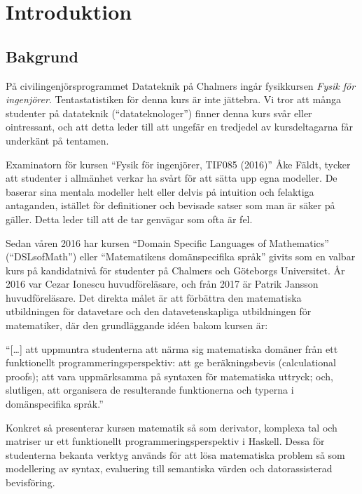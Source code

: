 
\chapter{Introduktion}

\section{Bakgrund}

På civilingenjörsprogrammet Datateknik på Chalmers ingår fysikkursen
\textit{Fysik för ingenjörer}. Tentastatistiken för denna kurs är
inte jättebra\cite{tentastatistik}. Vi
tror att många studenter på datateknik (``datateknologer'') finner denna kurs
svår eller ointressant, och att detta leder till att ungefär en
tredjedel av kursdeltagarna får underkänt på tentamen.

Examinatorn för kursen ``Fysik för ingenjörer, TIF085 (2016)'' Åke Fäldt, tycker
att studenter i allmänhet verkar ha svårt för att sätta upp egna
modeller. De baserar sina mentala modeller helt eller delvis på
intuition och felaktiga antaganden, istället för definitioner och
bevisade satser som man är säker på gäller. Detta leder till att de
tar genvägar som ofta är fel.

Sedan våren 2016 har kursen ``Domain Specific Languages of
Mathematics'' (``DSLsofMath'') eller ``Matematikens domänspecifika språk''
givits som en valbar kurs på kandidatnivå för studenter på Chalmers och
Göteborgs Universitet. År 2016 var Cezar Ionescu huvudföreläsare, och från 2017
är Patrik Jansson huvudföreläsare. Det direkta målet är att förbättra den
matematiska utbildningen för datavetare och den datavetenskapliga utbildningen
för matematiker, där den grundläggande idéen bakom kursen är: 

\begin{center}
  ``[\dots] att uppmuntra studenterna att närma sig matematiska domäner från ett
  funktionellt programmeringsperspektiv: att ge beräkningsbevis (calculational
  proofs); att vara uppmärksamma på syntaxen för matematiska uttryck; och,
  slutligen, att organisera de resulterande funktionerna och typerna i
  domänspecifika språk.''\cite{lecture-notes}\cite{tfpie2015} 
\end{center}

Konkret så presenterar kursen matematik så som derivator, komplexa
tal och matriser ur ett funktionellt programmeringsperspektiv i
Haskell. Dessa för studenterna bekanta verktyg används för att lösa
matematiska problem så som modellering av syntax, evaluering till
semantiska värden och datorassisterad bevisföring.

